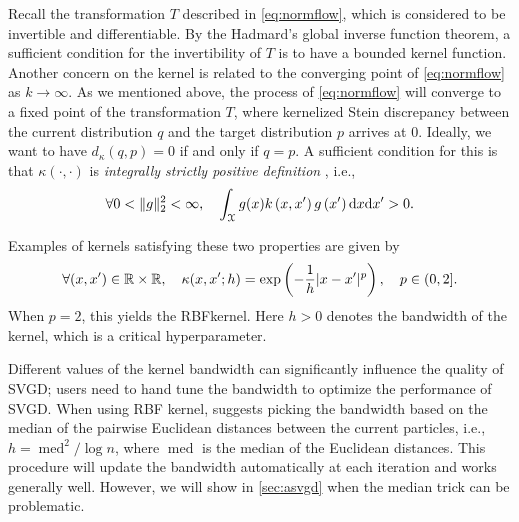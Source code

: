 Recall the transformation $T$ described in \cref{eq:normflow}, which is considered to be invertible and differentiable. By the Hadmard's global inverse function theorem, a sufficient condition for the invertibility of $T$ is to have a bounded kernel function. 
Another concern on the kernel is related to the converging point of \cref{eq:normflow} as $k \to \infty$. As we mentioned above, the process of \cref{eq:normflow} will converge to a fixed point of the transformation $T$, where kernelized Stein discrepancy between the current distribution $q$ and the target distribution $p$ arrives at 0. Ideally, we want to have $d_\kappa(q ,p) = 0$ if and only if $q = p$. A sufficient condition for this is that $\kappa(\cdot, \cdot)$ is \emph{integrally strictly positive definition} \citep{liu2016kernelized}, i.e., 
\[
\forall  0<\|g\|_{2}^{2}<\infty, \quad    \int_{\mathcal{X}} g(x) k\left(x, x^{\prime}\right) g\left(x^{\prime}\right) \mathrm{d} x \mathrm{d} x^{\prime}>0.    
\]

Examples of kernels satisfying these two properties are given by  
\[
\forall (x, x')\in \mathbb{R}\times \mathbb{R},\quad  \kappa(x, x'; h) = \exp\left( -\frac{1}{h} |x - x'|^p \right),  \quad p \in(0, 2].
\]
When $p = 2$, this yields the RBFkernel. Here $h> 0$ denotes the bandwidth of the kernel, which is a critical hyperparameter. 

Different values of the kernel bandwidth can significantly influence the quality of SVGD; users need to hand tune the bandwidth to optimize the performance of SVGD. When using RBF  kernel, \citet{liu2016stein} suggests picking the bandwidth based on the median of the pairwise Euclidean distances between the current particles, i.e., $h=\operatorname{med}^{2} / \log n$, where $\operatorname{med}$ is the median of the Euclidean distances. This procedure will update the bandwidth automatically at each iteration and works generally well. However, we will show in \cref{sec:asvgd} when the median trick can be problematic.




